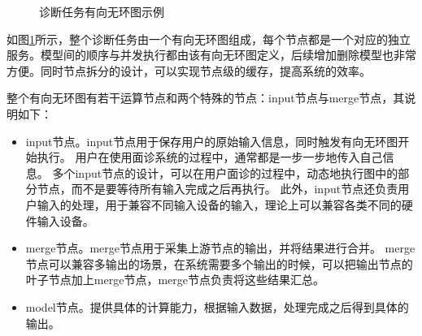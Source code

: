 \begin{figure}
    \centering
    \caption{诊断任务有向无环图示例}
    \label{fig:model_dag}
\end{figure}

如图\ref{fig:model_dag}所示，整个诊断任务由一个有向无环图组成，每个节点都是一个对应的独立服务。模型间的顺序与并发执行都由该有向无环图定义，后续增加删除模型也非常方便。同时节点拆分的设计，可以实现节点级的缓存，提高系统的效率。

整个有向无环图有若干运算节点和两个特殊的节点：input节点与merge节点，其说明如下：
\begin{itemize}
    \item input节点。input节点用于保存用户的原始输入信息，同时触发有向无环图开始执行。
    用户在使用面诊系统的过程中，通常都是一步一步地传入自己信息。
    多个input节点的设计，可以在用户面诊的过程中，动态地执行图中的部分节点，而不是要等待所有输入完成之后再执行。
    此外，input节点还负责用户输入的处理，用于兼容不同输入设备的输入，理论上可以兼容各类不同的硬件输入设备。

    \item merge节点。merge节点用于采集上游节点的输出，并将结果进行合并。
    merge节点可以兼容多输出的场景，在系统需要多个输出的时候，可以把输出节点的叶子节点加上merge节点，merge节点负责将这些结果汇总。

    \item model节点。提供具体的计算能力，根据输入数据，处理完成之后得到具体的输出。
\end{itemize}

